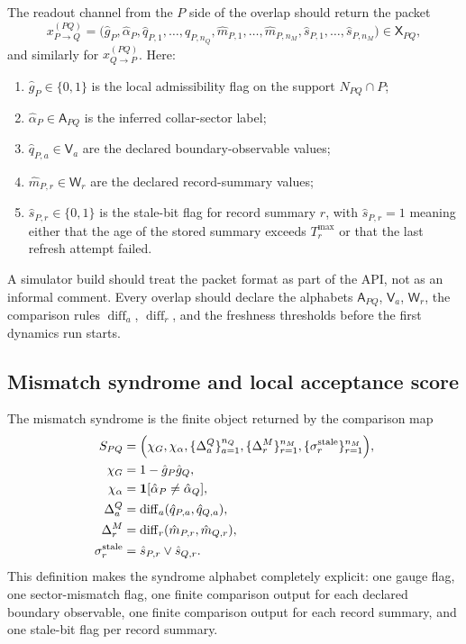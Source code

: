 \documentclass[11pt]{article}
\begin{document}
The readout channel from the $P$ side of the overlap should return the packet
\begin{equation}
x_{P\to Q}^{(PQ)}
=
\bigl(
\hat g_P,
\hat\alpha_P,
\hat q_{P,1},\dots,\hat q_{P,n_Q},
\hat m_{P,1},\dots,\hat m_{P,n_M},
\hat s_{P,1},\dots,\hat s_{P,n_M}
\bigr)
\in \mathsf X_{PQ},
\end{equation}
and similarly for $x_{Q\to P}^{(PQ)}$. Here:
\begin{enumerate}[leftmargin=2em]
\item $\hat g_P\in\{0,1\}$ is the local admissibility flag on the support $N_{PQ}\cap P$;
\item $\hat\alpha_P\in\mathsf A_{PQ}$ is the inferred collar-sector label;
\item $\hat q_{P,a}\in\mathsf V_a$ are the declared boundary-observable values;
\item $\hat m_{P,r}\in\mathsf W_r$ are the declared record-summary values;
\item $\hat s_{P,r}\in\{0,1\}$ is the stale-bit flag for record summary $r$, with
$\hat s_{P,r}=1$ meaning either that the age of the stored summary exceeds $T_r^{\max}$ or that
the last refresh attempt failed.
\end{enumerate}

A simulator build should treat the packet format as part of the API, not as an informal
comment. Every overlap should declare the alphabets $\mathsf A_{PQ}$, $\mathsf V_a$,
$\mathsf W_r$, the comparison rules $\operatorname{diff}_a$, $\operatorname{diff}_r$, and the
freshness thresholds before the first dynamics run starts.

\subsection{Mismatch syndrome and local acceptance score}

The mismatch syndrome is the finite object returned by the comparison map
\begin{align}
S_{PQ}
&=
\Bigl(
\chi_G,
\chi_{\alpha},
\{\Delta_a^{Q}\}_{a=1}^{n_Q},
\{\Delta_r^{M}\}_{r=1}^{n_M},
\{\sigma_r^{\mathrm{stale}}\}_{r=1}^{n_M}
\Bigr),\\
\chi_G
&=
1-\hat g_P\hat g_Q,\\
\chi_{\alpha}
&=
\mathbf 1[\hat\alpha_P\neq \hat\alpha_Q],\\
\Delta_a^{Q}
&=
\operatorname{diff}_a(\hat q_{P,a},\hat q_{Q,a}),\\
\Delta_r^{M}
&=
\operatorname{diff}_r(\hat m_{P,r},\hat m_{Q,r}),\\
\sigma_r^{\mathrm{stale}}
&=
\hat s_{P,r}\lor \hat s_{Q,r}.
\end{align}
This definition makes the syndrome alphabet completely explicit: one gauge flag, one
sector-mismatch flag, one finite comparison output for each declared boundary observable, one
finite comparison output for each record summary, and one stale-bit flag per record summary.
\end{document}
